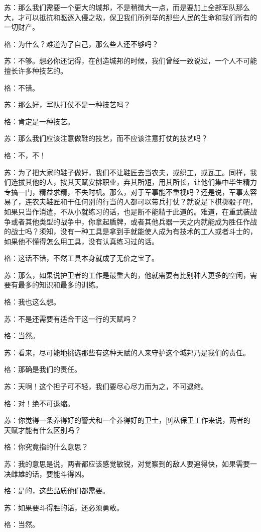 \documentclass[12pt,oneside]{book}
\begin{document}
苏：那么我们需要一个更大的城邦，不是稍微大一点，而是要加上全部军队那么大，才可以抵抗和驱逐入侵之敌，保卫我们所列举的那些人民的生命和我们所有的一切财产。

格：为什么？难道为了自己，那么些人还不够吗？

苏：不够。想必你还记得，在创造城邦的时候，我们曾经一致说过，一个人不可能擅长许多种技艺的。

格：不错。

苏：那么好，军队打仗不是一种技艺吗？

格：肯定是一种技艺。

苏：那么我们应该注意做鞋的技艺，而不应该注意打仗的技艺吗？

格：不，不！

苏：为了把大家的鞋子做好，我们不让鞋匠去当农夫，或织工，或瓦工。同样，我们选拔其他的人，按其天赋安排职业，弃其所短，用其所长，让他们集中毕生精力专搞一门，精益求精，不失时机。那么，对于军事能不重视吗？还是说，军事太容易了，连农夫鞋匠和干任何别的行当的人都可以带兵打仗？就说是下棋掷骰子吧，如果只当作消遣，不从小就练习的话，也是断不能精于此道的。难道，在重武装战争或者其他类型的战争中，你拿起盾牌，或者其他兵器一天之内就能成为胜任作战的战士吗？须知，没有一种工具是拿到手就能使人成为有技术的工人或者斗士的，如果他不懂得怎么用工具，没有认真练习过的话。

格：这话不错，不然工具本身就成了无价之宝了。

苏：那么，如果说护卫者的工作是最重大的，他就需要有比别种人更多的空闲，需要有最多的知识和最多的训练。

格：我也这么想。

苏：不是还需要有适合干这一行的天赋吗？

格：当然。

苏：看来，尽可能地挑选那些有这种天赋的人来守护这个城邦乃是我们的责任。

格：那确是我们的责任。

苏：天啊！这个担子可不轻，我们要尽心尽力而为之，不可退缩。

格：对！绝不可退缩。

苏：你觉得一条养得好的警犬和一个养得好的卫士，[9]从保卫工作来说，两者的天赋才能有什么区别吗？

格：你究竟指的什么意思？

苏：我的意思是说，两者都应该感觉敏锐，对觉察到的敌人要追得快，如果需要一决雌雄的话，要能斗得凶。

格：是的，这些品质他们都需要。

苏：如果要斗得胜的话，还必须勇敢。

格：当然。
\end{document}
